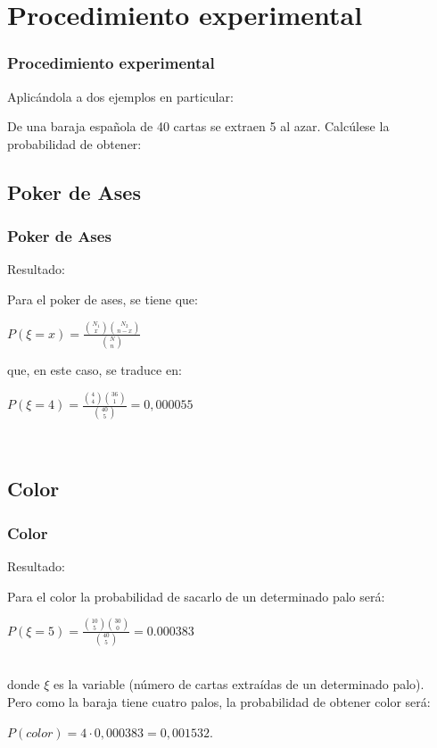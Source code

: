 \documentclass[10pt]{beamer}
\begin{document}

\section{Procedimiento experimental}
\begin{frame}
\frametitle{Procedimiento experimental}

Aplicándola a dos ejemplos en particular:

De una baraja española de 40 cartas se extraen 5 al azar. Calcúlese la probabilidad de obtener:

\end{frame}


\subsection{Poker de Ases}
\begin{frame}
\frametitle{Poker de Ases}
\begin{block}{Resultado:}

Para el poker de ases, se tiene que:

\centerline{$P(\xi=x)=\frac {\binom {N_1} {x} \binom {N_2} {n-x}} { \binom {N} {n} }$}

que, en este caso, se traduce en:
\ \\

\centerline{$P(\xi=4)=\frac {\binom {4} {4} \binom {36} {1}} { \binom {40} {5} }=0,000055$}
\ \\

\end{block}
\end{frame}


\subsection{Color}
\begin{frame}
\frametitle{Color}
\begin{block}{Resultado:}

Para el color la probabilidad de sacarlo de un determinado palo será:
\ \\

\centerline{$P(\xi=5)=\frac {\binom {10} {5} \binom {30} {0}} { \binom {40} {5} } = 0.000383$} 

\ \\

donde $\xi$ es la variable (número de cartas extraídas de un determinado palo).\\
Pero como la baraja tiene cuatro palos, la probabilidad de obtener color será: \\

\centerline{$P(color)=4\cdot 0,000383=0,001532.$}

\end{block}
\end{frame}
\end{document}
